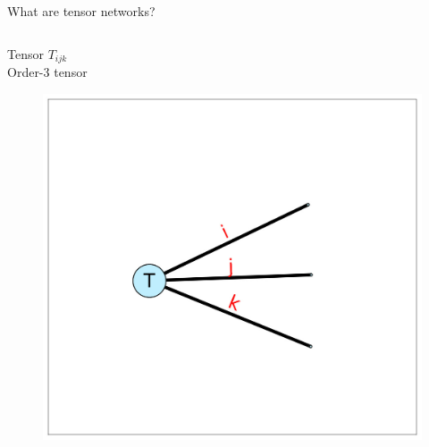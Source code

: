\begin{frame}{What are tensor networks?}
\begin{columns}
  \begin{column}[T]{0.33\textwidth}
    \centering
    Tensor $T_{ijk}$ \\
    Order-3 tensor
    \begin{figure}[T]
      \includegraphics[width=1.0\textwidth]{
        slides/assets/what-are-tensor-networks-tensor-order-3.jpg
      }
    \end{figure}
  \end{column}

\end{columns}


\end{frame}
